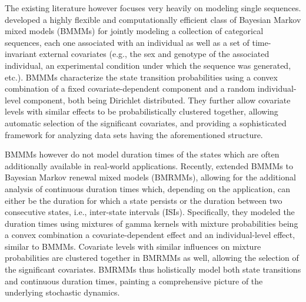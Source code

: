 The existing literature however focuses very heavily on modeling single sequences. 
\cite{sarkar2018bayesian} developed a highly flexible and computationally efficient class of Bayesian Markov mixed models (BMMMs) for 
jointly modeling a collection of categorical sequences, 
each one associated with an individual as well as a set of time-invariant external covariates (e.g., the sex and genotype of the associated individual, an experimental condition under which the sequence was generated, etc.). 
BMMMs characterize the state transition probabilities using a convex combination of a fixed covariate-dependent component and a random individual-level component, 
both being Dirichlet distributed. 
They further allow covariate levels with similar effects to be probabilistically clustered together, allowing automatic selection of the significant covariates, and providing a sophisticated framework for analyzing data sets having the aforementioned structure. 

{BMMMs however do not model duration times of the states which are often additionally available in real-world applications.  
Recently, \cite{wu2021bayesian} extended BMMMs to Bayesian Markov renewal mixed models (BMRMMs), 
allowing for the additional analysis of continuous duration times which, depending on the application, can either be the duration for which a state persists or the duration between two consecutive states, i.e., inter-state intervals (ISIs).
Specifically, they modeled the duration times using mixtures of gamma kernels with mixture probabilities being a convex combination a covariate-dependent effect and an individual-level effect, similar to BMMMs. 
Covariate levels with similar influences on mixture probabilities are clustered together in BMRMMs as well, allowing the selection of the significant covariates.  
BMRMMs thus holistically model both state transitions and continuous duration times, painting a comprehensive picture of the underlying stochastic dynamics. %
}


